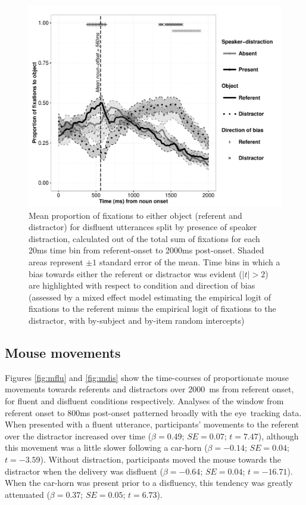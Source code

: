 \documentclass[a4paper,man,natbib]{apa6}
\newcommand*{\SE}{\mathit{SE}} %
\begin{document}
\begin{figure}[Ht] %
  \centering
	\includegraphics[width=\linewidth]{eye_disf.pdf}
  \caption{Mean proportion of fixations to either object (referent and distractor) for disfluent utterances split by presence of speaker distraction, calculated out of the total sum of fixations for each 20ms time bin from referent-onset to 2000ms post-onset. Shaded areas represent $\pm 1$ standard error of the mean. Time bins in which a bias towards either the referent or distractor was evident ($|t|>2$) are highlighted with respect to condition and direction of bias (assessed by a mixed effect model estimating the empirical logit of fixations to the referent minus the empirical logit of fixations to the distractor, with by-subject and by-item random intercepts)}
  \label{fig:diseye}
\end{figure}

\subsection{Mouse movements}
Figures \ref{fig:mflu} and \ref{fig:mdis} show the time-courses of proportionate mouse movements towards referents and distractors over 2000~ms from referent onset, for fluent and disfluent conditions respectively. 
Analyses of the window from referent onset to 800ms post-onset patterned broadly with the eye~tracking data. 
When presented with a fluent utterance, participants' movements to the referent over the distractor increased over time ($\beta = 0.49$; $\SE = 0.07$; $t=7.47$), although this movement was a little slower following a car-horn ($\beta = -0.14$; $\SE = 0.04$; $t=-3.59$).
Without distraction, participants moved the mouse towards the distractor when the delivery was disfluent ($\beta = -0.64$; $\SE = 0.04$; $t=-16.71$). 
When the car-horn was present prior to a disfluency, this tendency was greatly attenuated ($\beta = 0.37$; $\SE = 0.05$; $t=6.73$). 
\end{document}
